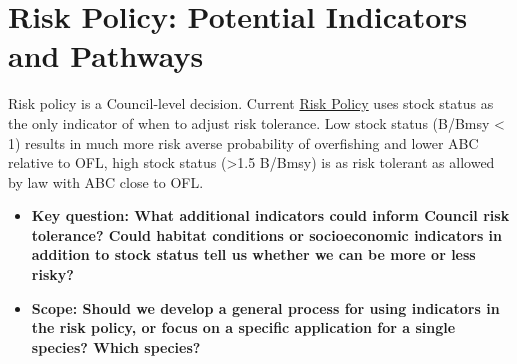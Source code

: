 \documentclass[
]{article}
\author{}
\date{\vspace{-2.5em}}
\begin{document}
\vspace{-1cm}

\section{Risk Policy: Potential Indicators and
Pathways}\label{risk-policy-potential-indicators-and-pathways}

\begin{noteblock}
Risk policy is a Council-level decision. Current
\href{https://www.federalregister.gov/documents/2020/12/15/2020-27562/fisheries-of-the-northeastern-united-states-omnibus-framework-adjustment-to-modify-the-mid-atlantic}{Risk
Policy} uses stock status as the only indicator of when to adjust risk
tolerance. Low stock status (B/Bmsy \textless{} 1) results in much more
risk averse probability of overfishing and lower ABC relative to OFL,
high stock status (\textgreater1.5 B/Bmsy) is as risk tolerant as
allowed by law with ABC close to OFL.

\end{noteblock}

\begin{itemize}
\item
  \textbf{Key question: What additional indicators could inform Council
  risk tolerance? Could habitat conditions or socioeconomic indicators
  in addition to stock status tell us whether we can be more or less
  risky?}
\item
  \textbf{Scope: Should we develop a general process for using
  indicators in the risk policy, or focus on a specific application for
  a single species? Which species?}
\end{itemize}
\end{document}
